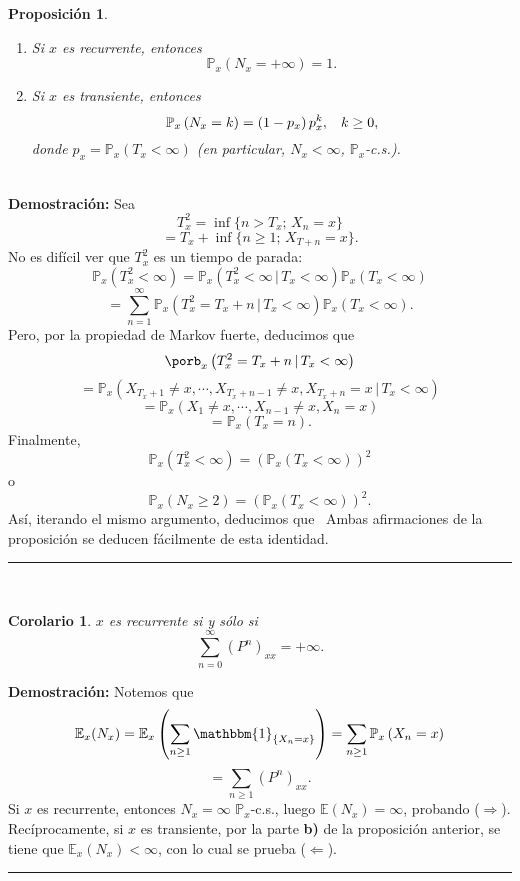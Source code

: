 \documentclass[a4paper]{article}
\newcommand{\prob}{\mathbb{P}}
\newtheorem{prop}{Proposici\'on}
\newtheorem{cor}{Corolario}
\numberwithin{equation}{subsection}
\def\E{\mathbb E}
\begin{document}
 \begin{prop}
    \begin{enumerate}
        \item[a)] Si $x$ es recurrente, entonces
        \[\prob_x\left(N_x = +\infty\right) = 1.\]
        \item[b)] Si $x$ es transiente, entonces
        \[\prob_x\left(N_x =k\right) = \left(1 - p_x\right)p_x^k,\hspace{0.3cm}k\geq 0,\]
        donde $p_x = \prob_x\left(T_x<\infty\right)$ (en particular, $N_x<\infty$, $\prob_x$-c.s.).
    \end{enumerate}
 \end{prop}\\ \newline
\textbf{Demostración: }Sea 
\[T_x^2 = \inf\{n> T_x;\,X_n=x\}\]
\[= T_x + \inf\{n\geq 1;\,X_{T+n}=x\}.\]
No es difícil ver que $T_x^2$ es un tiempo de parada:
\[\prob_x\left(T_x^2 < \infty\right) = \prob_x\left(T_x^2<\infty\,|\,T_x<\infty\right)\prob_x\left(T_x<\infty\right)\]
\[= \sum_{n=1}^{\infty}\prob_x\left(T_x^2= T_x + n\,|\,T_x<\infty\right)\prob_x\left(T_x <\infty\right).\]
Pero, por la propiedad de Markov fuerte, deducimos que
\[\porb_x\left(T_x^2 = T_x +n\,|\,T_x<\infty\right)\]
\[=\prob_x\left(X_{T_x +1}\neq x,\cdots,X_{T_x +n-1}\neq x,X_{T_x +n}=x\,|\,T_x<\infty\right)\]
\[= \prob_x\left(X_1\neq x,\cdots,X_{n-1}\neq x,X_n=x\right)\]
\[=\prob_x\left(T_x=n\right).\]
Finalmente,
\[\prob_x\left(T_x^2<\infty\right)=(\prob_x\left(T_x<\infty\right))^2\]
o
\[\prob_x\left(N_x\geq 2\right) = (\prob_x\left(T_x<\infty\right))^2.\]
Así, iterando el mismo argumento, deducimos que
\
Ambas afirmaciones de la proposición se deducen fácilmente de esta identidad.\\
\rule{0.7em}{0.7em}\\ \newline
\begin{cor}
$x$ es recurrente si y sólo si
\[\sum_{n=0}^{\infty}\left(P^n\right)_{xx} = +\infty.\]
\end{cor}
\textbf{Demostración: }Notemos que
\[\E_x(N_x) = \E_x\left(\sum_{n\geq 1}\mathbbm{1}_{\{X_n=x\}}\right) = \sum_{n\geq 1}\prob_x\left(X_n=x\right)\]
\[= \sum_{n\geq 1}\left(P^n\right)_{xx}.\]
Si $x$ es recurrente, entonces $N_x=\infty$ $\prob_x$-c.s., luego $\E(N_x)=\infty$, probando ($\Longrightarrow$).\\ \newline
Recíprocamente, si $x$ es transiente, por la parte \textbf{b)} de la proposición anterior, se tiene que $\E_x(N_x)<\infty$, con lo cual se prueba ($\Longleftarrow$).\\
\rule{0.7em}{0.7em}\\ \newline
\end{document}
